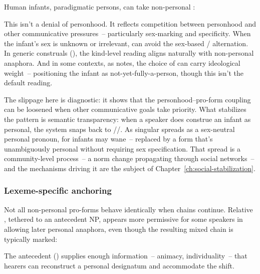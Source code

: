 Human infants, paradigmatic persons, can take non-personal :

\z
This isn't a denial of personhood. It reflects competition between personhood and other communicative pressures~-- particularly sex-marking and specificity. When the infant's sex is unknown or irrelevant,  can avoid the sex-based / alternation. In generic construals (), the kind-level reading aligns naturally with non-personal anaphora. And in some contexts, as \textcite{mcconnell-ginet2014} notes, the choice of  can carry ideological weight~-- positioning the infant as not-yet-fully-a-person, though this isn't the default reading.

The slippage here is diagnostic: it shows that the personhood--pro-form coupling can be loosened when other communicative goals take priority. What stabilizes the pattern is semantic transparency: when a speaker does construe an infant as personal, the system snaps back to //. As singular  spreads as a sex-neutral personal pronoun,  for infants may wane~-- replaced by a form that's unambiguously personal without requiring sex specification. That spread is a community-level process~-- a norm change propagating through social networks~-- and the mechanisms driving it are the subject of Chapter~\ref{ch:social-stabilization}.

\subsubsection{Lexeme-specific anchoring}
\label{sec:12:anchoring}

Not all non-personal pro-forms behave identically when chains continue. Relative , tethered to an antecedent NP, appears more permissive for some speakers in allowing later personal anaphora, even though the resulting mixed chain is typically marked:

\z
The antecedent () supplies enough information~-- animacy, individuality~-- that hearers can reconstruct a personal designatum and accommodate the shift.

